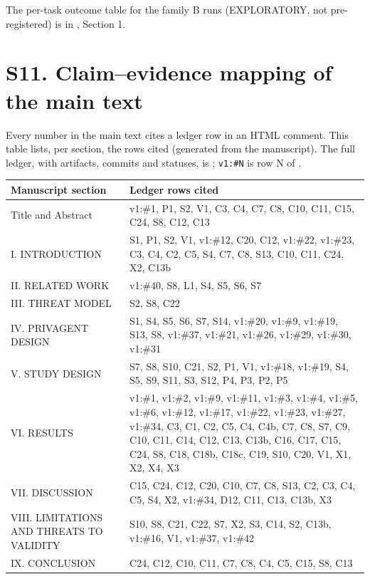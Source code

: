 \documentclass[10pt]{article}
\begin{document}
The per-task outcome table for the  family B runs (EXPLORATORY, not pre-registered) is in , Section 1.

\section*{S11. Claim--evidence mapping of the main text}

Every number in the main text cites a ledger row in an HTML comment. This table lists, per section, the rows cited (generated from the manuscript). The full ledger, with artifacts, commits and statuses, is ; \texttt{v1:\#N} is row N of .

{\footnotesize
\setlength{\tabcolsep}{3pt}
\begin{longtable}{>{\raggedright\arraybackslash}p{0.406\dimexpr\linewidth-4\tabcolsep\relax}>{\raggedright\arraybackslash}p{0.594\dimexpr\linewidth-4\tabcolsep\relax}}
\hline
\textbf{Manuscript section} & \textbf{Ledger rows cited} \\
\hline
\endhead
Title and Abstract & v1:\#1, P1, S2, V1, C3, C4, C7, C8, C10, C11, C15, C24, S8, C12, C13 \\
I. INTRODUCTION & S1, P1, S2, V1, v1:\#12, C20, C12, v1:\#22, v1:\#23, C3, C4, C2, C5, S4, C7, C8, S13, C10, C11, C24, X2, C13b \\
II. RELATED WORK & v1:\#40, S8, L1, S4, S5, S6, S7 \\
III. THREAT MODEL & S2, S8, C22 \\
IV. PRIVAGENT DESIGN & S1, S4, S5, S6, S7, S14, v1:\#20, v1:\#9, v1:\#19, S13, S8, v1:\#37, v1:\#21, v1:\#26, v1:\#29, v1:\#30, v1:\#31 \\
V. STUDY DESIGN & S7, S8, S10, C21, S2, P1, V1, v1:\#18, v1:\#19, S4, S5, S9, S11, S3, S12, P4, P3, P2, P5 \\
VI. RESULTS & v1:\#1, v1:\#2, v1:\#9, v1:\#11, v1:\#3, v1:\#4, v1:\#5, v1:\#6, v1:\#12, v1:\#17, v1:\#22, v1:\#23, v1:\#27, v1:\#34, C3, C1, C2, C5, C4, C4b, C7, C8, S7, C9, C10, C11, C14, C12, C13, C13b, C16, C17, C15, C24, S8, C18, C18b, C18c, C19, S10, C20, V1, X1, X2, X4, X3 \\
VII. DISCUSSION & C15, C24, C12, C20, C10, C7, C8, S13, C2, C3, C4, C5, S4, X2, v1:\#34, D12, C11, C13, C13b, X3 \\
VIII. LIMITATIONS AND THREATS TO VALIDITY & S10, S8, C21, C22, S7, X2, S3, C14, S2, C13b, v1:\#16, V1, v1:\#37, v1:\#42 \\
IX. CONCLUSION & C24, C12, C10, C11, C7, C8, C4, C5, C15, S8, C13 \\
\hline
\end{longtable}}
\end{document}
